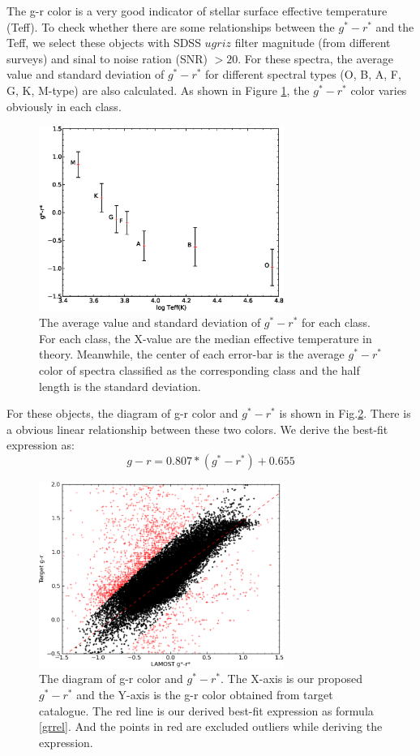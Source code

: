 \documentclass[referee]{raa}            %
\begin{document}
The g-r color  is a very good indicator of stellar surface effective temperature (Teff)\citep{lee2008segue,ivezic2008milky}.
To check whether there are some relationships between the $g^*-r^*$ and the Teff, we select these objects with SDSS $ugriz$ filter magnitude (from different surveys) and sinal to noise ration  (SNR) $>20$.
For these spectra, the average value and standard deviation of $g^*-r^*$ for different spectral types (O, B, A, F, G, K, M-type) are also calculated.
 As shown in Figure \ref{Fig1}, the $g^*-r^*$ color varies obviously in each class.
 \begin{figure}
   \centering
   \includegraphics[width=8cm, angle=0,clip]{f5.eps}
   \caption{The average value and standard deviation of $g^*-r^*$ for  each class.
   For each class, the X-value are the median effective temperature in theory.
   Meanwhile, the center of each error-bar is the average  $g^*-r^*$ color of spectra classified as the corresponding class and the half length is the standard deviation.
   }
   \label{Fig1}
   \end{figure}

For these objects, the diagram of g-r color and $g^*-r^*$ is  shown in Fig.\ref{Fig2}.
There is a obvious linear relationship between these two colors.
We derive the  best-fit expression as:
\begin{equation}
 g-r=0.807* (g^*-r^*)+  0.655
 \label{eq2}
\end{equation}

 \begin{figure}
   \centering
   \includegraphics[width=8cm, angle=0, clip=true]{f1.eps}
   \caption{The diagram of g-r color and $g^*-r^*$.
   The X-axis is our proposed $g^*-r^*$ and the Y-axis is the g-r color obtained from target catalogue.
   The red line is our derived best-fit expression as formula \ref{grrel}.
   And the points in red are excluded outliers while deriving the expression.
   }
   \label{Fig2}
   \end{figure}
\end{document}
